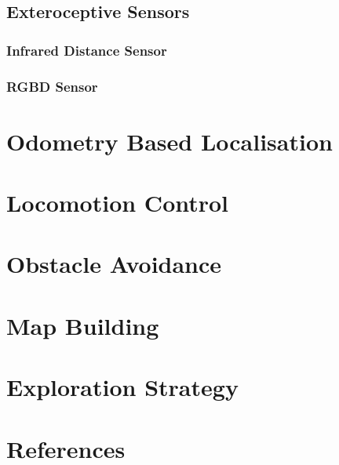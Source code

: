 \documentclass[a4paper]{article}
\begin{document}
\subsection{Exteroceptive Sensors}

\subsubsection{Infrared Distance Sensor}

\subsubsection{RGBD Sensor}

\section{Odometry Based Localisation}

\section{Locomotion Control}

\section{Obstacle Avoidance}

\section{Map Building}

\section{Exploration Strategy}

\section{References}
\end{document}
